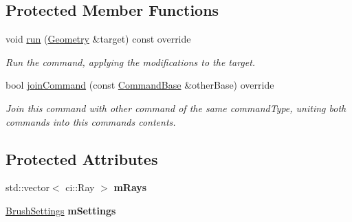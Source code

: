 \subsection*{Protected Member Functions}
\begin{DoxyCompactItemize}
\item 
\mbox{\label{classpepr3d_1_1_cmd_paint_brush_af77ed19d5ba71492a6e513a204b00ba5}} 
void \mbox{\hyperlink{classpepr3d_1_1_cmd_paint_brush_af77ed19d5ba71492a6e513a204b00ba5}{run}} (\mbox{\hyperlink{classpepr3d_1_1_geometry}{Geometry}} \&target) const override
\begin{DoxyCompactList}\small\item\em Run the command, applying the modifications to the target. \end{DoxyCompactList}\item 
bool \mbox{\hyperlink{classpepr3d_1_1_cmd_paint_brush_a05e6c87b7cd47b72150e05f2ee584ee8}{join\+Command}} (const \mbox{\hyperlink{classpepr3d_1_1_command_base}{Command\+Base}} \&other\+Base) override
\begin{DoxyCompactList}\small\item\em Join this command with other command of the same command\+Type, uniting both commands into this command\textquotesingle{}s contents. \end{DoxyCompactList}\end{DoxyCompactItemize}
\subsection*{Protected Attributes}
\begin{DoxyCompactItemize}
\item 
\mbox{\label{classpepr3d_1_1_cmd_paint_brush_a06ebbb4a1031e29a7929dd80c87bcd38}} 
std\+::vector$<$ ci\+::\+Ray $>$ {\bfseries m\+Rays}
\item 
\mbox{\label{classpepr3d_1_1_cmd_paint_brush_a859b62eb61a41ecf2d0c740b3eeecb4f}} 
\mbox{\hyperlink{structpepr3d_1_1_brush_settings}{Brush\+Settings}} {\bfseries m\+Settings}
\end{DoxyCompactItemize}
